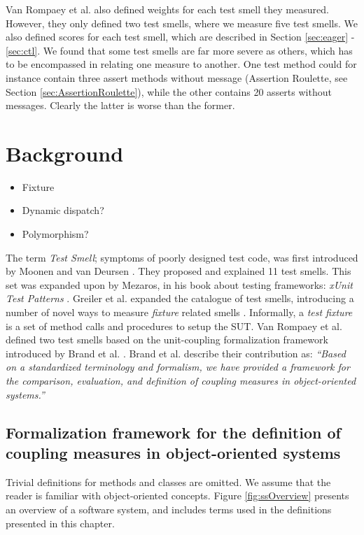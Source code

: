 \documentclass{uvamscse}
\newcommand{\AtestSmell}{Moonen and van Deursen}
\newcommand{\AtestFixture}{Greiler et al.}
\newcommand{\AtestxUnit}{Mezaros}
\newcommand{\AsigTS}{Van Rompaey et al.}
\newcommand{\Aframework}{Brand et al.}
\begin{document}
\AsigTS{} also defined weights for each test smell they measured. However, they only defined two test smells, where we measure five test smells. We also defined scores for each test smell, which are described in Section \ref{sec:eager} - \ref{sec:ctl}. We found that some test smells are far more severe as others, which has to be encompassed in relating one measure to another. One test method could for instance contain three assert methods without message (Assertion Roulette, see Section \ref{sec:AssertionRoulette}), while the other contains 20 asserts without messages. Clearly the latter is worse than the former.

\section{Background}

\begin{itemize}
	\item Fixture
	\item Dynamic dispatch?
	\item Polymorphism?
\end{itemize}

The term \emph{Test Smell}; symptoms of poorly designed test code, was first introduced by \AtestSmell{}  \cite{van2001refactoring}. They proposed and explained 11 test smells. This set was expanded upon by \AtestxUnit{}, in his book about testing frameworks: \emph{xUnit Test Patterns} \cite{meszaros2007xunit}. \AtestFixture{} expanded the catalogue of test smells, introducing a number of novel ways to measure \emph{fixture} related smells \cite{greiler2013automated}. Informally, a \emph{test fixture} is a set of method calls and procedures to setup the SUT. \AsigTS{} defined two test smells based on the unit-coupling formalization framework introduced by \Aframework{} \cite{van2006characterizing, briand1999unified}. \Aframework{} describe their contribution as:  \emph{``Based on a standardized terminology and formalism, we have provided a framework for the comparison, evaluation, and definition of coupling measures in object-oriented systems.''}

\subsection{Formalization framework for the definition of coupling measures in object-oriented systems}
Trivial definitions for methods and classes are omitted. We assume that the reader is familiar with object-oriented concepts. Figure \ref{fig:ssOverview} presents an overview of a software system, and includes terms used in the definitions presented in this chapter.
\end{document}

